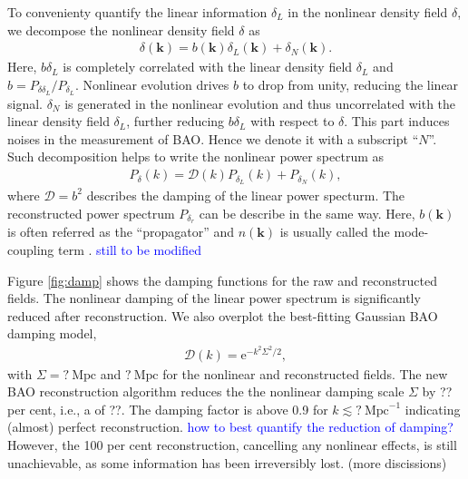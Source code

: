 \documentclass[aps,prd,twocolumn,showpacs,superscriptaddress,groupedaddress,nofootinbib]{revtex4}  %
\newcommand{\mr}{\mathrm}
\newcommand{\tcb}{\textcolor{blue}}
\newcommand{\bea}{\begin{eqnarray}}
\newcommand{\eea}{\end{eqnarray}}
\begin{document}
To convenienty quantify the linear information $\delta_L$ in 
the nonlinear density field $\delta$, we decompose the nonlinear density field
$\delta$ as
\begin{eqnarray}
\delta(\bm{k})=b(\bm{k})\delta_L(\bm{k})+\delta_N(\bm{k}).
\end{eqnarray}
Here, $b\delta_L$ is completely correlated with the linear density field 
$\delta_L$ and $b=P_{\delta\delta_L}/P_{\delta_L}$.
Nonlinear evolution drives $b$ to drop from unity, reducing the linear signal.
$\delta_N$ is generated in the nonlinear evolution and thus uncorrelated with
the linear density field $\delta_L$, further reducing $b\delta_L$ with respect
to $\delta$. This part induces noises in the measurement of BAO. 
Hence we denote it with a subscript ``$N$''. 
Such decomposition helps to write the nonlinear power spectrum as
\bea
P_\delta(k)=\mathcal{D}(k)P_{\delta_L}(k)+P_{\delta_N}(k),
\eea
where $\mathcal{D}=b^2$ describes the damping of the linear power specturm.
The reconstructed power spectrum $P_{\delta_r}$ can be describe in the same way.
Here, $b(\bm{k})$ is often referred as the ``propagator'' 
and $n(\bm{k})$ is usually
called the mode-coupling term \cite{2006crocce,2008crocce,2008matsubara}.
\tcb{still to be modified}


Figure \ref{fig:damp} shows the damping functions for the raw and reconstructed 
fields. The nonlinear damping of the linear power spectrum is 
significantly reduced after reconstruction. We also overplot the best-fitting 
Gaussian BAO damping model,
\bea
\mathcal{D}(k)=\mr{e}^{-k^2\Sigma^2/2},
\eea
with $\Sigma=?\ \mr{Mpc}$ and $?\ \mr{Mpc}$ for the nonlinear and reconstructed 
fields. The new BAO reconstruction algorithm reduces the the nonlinear damping
scale $\Sigma$ by ?? per cent, i.e., a of ??. The damping factor is above 0.9
for $k\lesssim?\ \mr{Mpc}^{-1}$ indicating (almost) perfect reconstruction. 
\tcb{how to best quantify the reduction of damping? }
However, the 100 per cent reconstruction, cancelling any nonlinear effects,
is still unachievable, as some information has been irreversibly lost. (more 
discissions)
\end{document}
